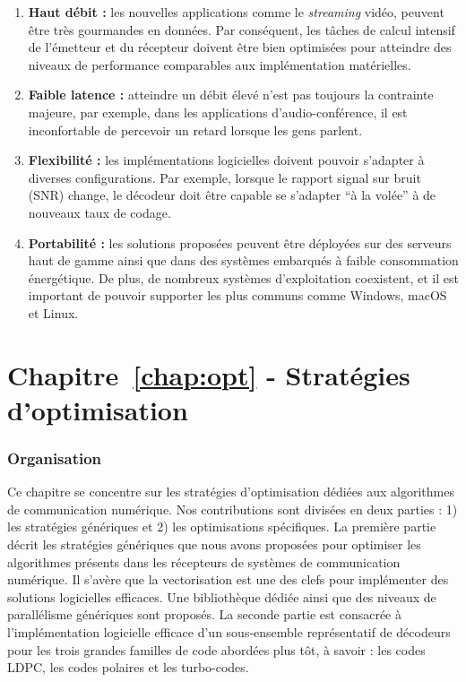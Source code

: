 \begin{enumerate}
  \item \textbf{Haut débit :}
    les nouvelles applications comme le \emph{streaming} vidéo, peuvent être
    très gourmandes en données. Par conséquent, les tâches de calcul intensif de
    l'émetteur et du récepteur doivent être bien optimisées pour atteindre des
    niveaux de performance comparables aux implémentation matérielles.

  \item \textbf{Faible latence :}
    atteindre un débit élevé n'est pas toujours la contrainte majeure, par
    exemple, dans les applications d'audio-conférence, il est inconfortable de
    percevoir un retard lorsque les gens parlent.

  \item \textbf{Flexibilité :}
    les implémentations logicielles doivent pouvoir s'adapter à diverses
    configurations. Par exemple, lorsque le rapport signal sur bruit (SNR)
    change, le décodeur doit être capable se s'adapter ``à la volée'' à de
    nouveaux taux de codage.

  \item \textbf{Portabilité :}
    les solutions proposées peuvent être déployées sur des serveurs haut de
    gamme ainsi que dans des systèmes embarqués à faible consommation
    énergétique. De plus, de nombreux systèmes d'exploitation coexistent, et il
    est important de pouvoir supporter les plus communs comme Windows, macOS et
    Linux.
\end{enumerate}

\section*{Chapitre~\ref{chap:opt} - Stratégies d'optimisation}

\subsubsection*{Organisation}

Ce chapitre se concentre sur les stratégies d'optimisation dédiées aux
algorithmes de communication numérique. Nos contributions sont divisées en deux
parties : 1) les stratégies génériques et 2) les optimisations spécifiques.
La première partie décrit les stratégies génériques que nous avons proposées
pour optimiser les algorithmes présents dans les récepteurs de systèmes de
communication numérique. Il s'avère que la vectorisation est une des clefs pour
implémenter des solutions logicielles efficaces. Une bibliothèque dédiée ainsi
que des niveaux de parallélisme génériques sont proposés. La seconde partie est
consacrée à l'implémentation logicielle efficace d'un sous-ensemble
représentatif de décodeurs pour les trois grandes familles de code abordées plus
tôt, à savoir : les codes LDPC, les codes polaires et les turbo-codes.

